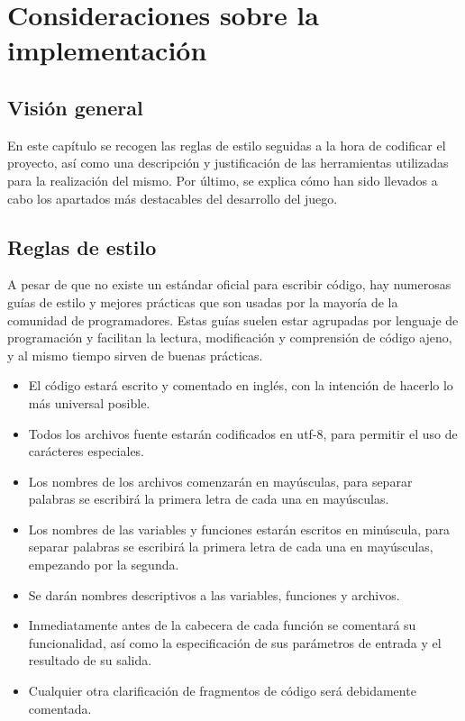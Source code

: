 \chapter{Consideraciones sobre la implementación}

\section{Visión general}

	En este capítulo se recogen las reglas de estilo seguidas a la hora de codificar el proyecto, así como una descripción y justificación de las herramientas utilizadas para la realización del mismo. Por último, se explica cómo han sido llevados a cabo los apartados más destacables del desarrollo del juego.

\section{Reglas de estilo}

	A pesar de que no existe un estándar oficial para escribir código, hay numerosas guías de estilo y mejores prácticas que son usadas por la mayoría de la comunidad de programadores. Estas guías suelen estar agrupadas por lenguaje de programación y facilitan la lectura, modificación y comprensión de código ajeno, y al mismo tiempo sirven de buenas prácticas.

	\begin{itemize}
		\item El código estará escrito y comentado en inglés, con la intención de hacerlo lo más universal posible.

		\item Todos los archivos fuente estarán codificados en \acrshort{utf}-8, para permitir el uso de carácteres especiales.

		\item Los nombres de los archivos comenzarán en mayúsculas, para separar palabras se escribirá la primera letra de cada una en mayúsculas.

		\item Los nombres de las variables y funciones estarán escritos en minúscula, para separar palabras se escribirá la primera letra de cada una en mayúsculas, empezando por la segunda.

		\item Se darán nombres descriptivos a las variables, funciones y archivos.

		\item Inmediatamente antes de la cabecera de cada función se comentará su funcionalidad, así como la especificación de sus parámetros de entrada y el resultado de su salida.

		\item Cualquier otra clarificación de fragmentos de código será debidamente comentada.
	\end{itemize}

